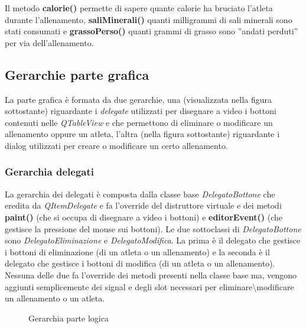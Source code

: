 \documentclass[10pt, a4paper]{article}
\begin{document}
Il metodo \textbf{calorie()} permette di sapere quante calorie ha bruciato l'atleta durante l'allenamento,
\textbf{saliMinerali()} quanti milligrammi di sali minerali sono stati consumati e \textbf{grassoPerso()} quanti grammi
di grasso sono ''andati perduti'' per via dell'allenamento.

\subsection{Gerarchie parte grafica}
La parte grafica è formata da due gerarchie, una (visualizzata nella figura sottostante) riguardante i \emph{delegate} 
utilizzati per disegnare a video i bottoni contenuti nelle \emph{QTableView} e che permettono di eliminare o modificare 
un allenamento oppure un atleta, l'altra (nella figura sottostante) riguardante i dialog utilizzati per
creare o modificare un certo allenamento.

\subsubsection{Gerarchia delegati}
La gerarchia dei delegati è composta dalla classe base \emph{DelegatoBottone} che eredita da
\emph{QItemDelegate} e fa l'override del distruttore virtuale e dei metodi \textbf{paint()}
(che si occupa di disegnare a video i bottoni) e \textbf{editorEvent()} (che gestisce
la pressione del mouse sui bottoni). Le due sottoclassi di \emph{DelegatoBottone} sono
\emph{DelegatoEliminazione} e \emph{DelegatoModifica}. La prima è il delegato che gestisce i
bottoni di eliminazione (di un atleta o un allenamento) e la seconda è il delegato che gestisce
i bottoni di modifica (di un atleta o un allenamento). Nessuna delle due fa l'override dei metodi
presenti nella classe base ma, vengono aggiunti semplicemente dei signal e degli slot
necessari per eliminare\textbackslash modificare un allenamento o un atleta.
\begin{figure}[H]
	\centering
	\def\svgwidth{.75\linewidth}
	
	\label{figure:gerarchiaBottoni}
	\caption{Gerarchia parte logica}
\end{figure}
\end{document}
